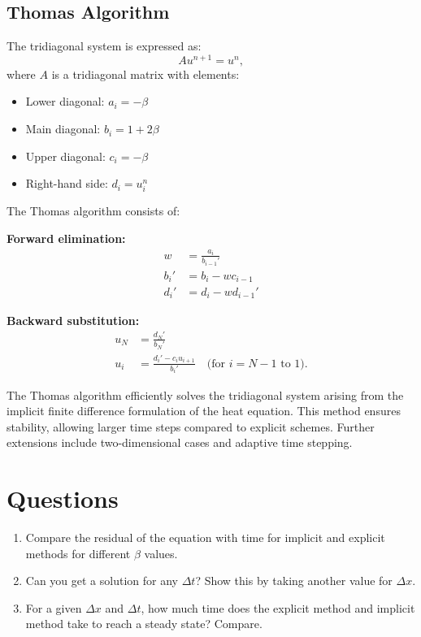 \documentclass[12pt]{article}
\begin{document}
\subsection{Thomas Algorithm}
The tridiagonal system is expressed as:
\begin{equation}
    A u^{n+1} = u^n,
\end{equation}
where $A$ is a tridiagonal matrix with elements:
\begin{itemize}
    \item Lower diagonal: $a_i = -\beta$
    \item Main diagonal: $b_i = 1 + 2\beta$
    \item Upper diagonal: $c_i = -\beta$
    \item Right-hand side: $d_i = u_i^n$
\end{itemize}
The Thomas algorithm consists of:

\textbf{Forward elimination:}
\begin{align}
    w &= \frac{a_i}{b_{i-1}'} \\
    b_i' &= b_i - w c_{i-1} \\
    d_i' &= d_i - w d_{i-1}'
\end{align}

\textbf{Backward substitution:}
\begin{align}
    u_N &= \frac{d_N'}{b_N'} \\
    u_i &= \frac{d_i' - c_i u_{i+1}}{b_i'} \quad \text{(for $i = N-1$ to $1$)}.
\end{align}

The Thomas algorithm efficiently solves the tridiagonal system arising from the implicit finite difference formulation of the heat equation. This method ensures stability, allowing larger time steps compared to explicit schemes. Further extensions include two-dimensional cases and adaptive time stepping.


\section*{Questions}

\begin{enumerate}
    \item Compare the residual of the equation with time for implicit and explicit methods for different \( \beta \) values.
    \item Can you get a solution for any \( \Delta t \)? Show this by taking another value for \( \Delta x \).
    \item For a given \( \Delta x \) and \( \Delta t \), how much time does the explicit method and implicit method take to reach a steady state? Compare.
\end{enumerate}
\end{document}
